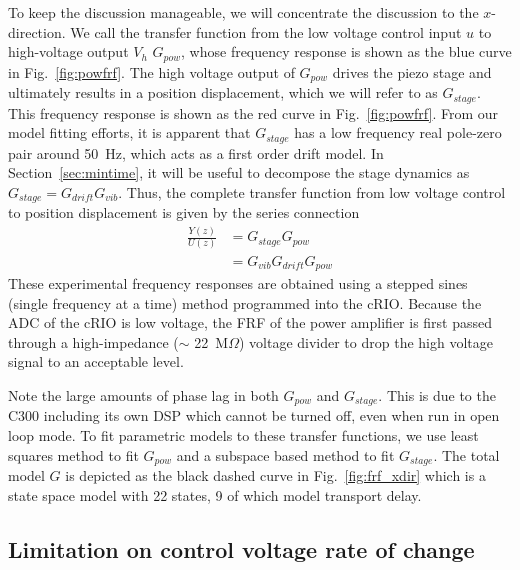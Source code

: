 \documentclass[journal,12pt,twocolumn,twoside]{IEEEtran/IEEEtran}
\begin{document}
To keep the discussion manageable, we will concentrate the discussion to the $x$-direction.
We call the transfer function from the low voltage control input $u$ to high-voltage output $V_{h}$ $G_{pow}$, whose frequency response is shown as the blue curve in Fig.~\ref{fig:powfrf}. The high voltage output of $G_{pow}$ drives the piezo stage and ultimately results in a position displacement, which we will refer to as $G_{stage}$. This frequency response is shown as the red curve in Fig.~\ref{fig:powfrf}. From our model fitting efforts, it is apparent that $G_{stage}$ has a low frequency real pole-zero pair around 50~Hz, which acts as a first order drift model. In Section~\ref{sec:mintime}, it will be useful to decompose the stage dynamics as $G_{stage} = G_{drift}G_{vib}$. 
Thus, the complete transfer function from low voltage control to position displacement is given by the series connection
\begin{align}
  \frac{Y(z)}{U(z)} &= G_{stage}G_{pow}\\
                    & =G_{vib}G_{drift}G_{pow}
\end{align}
These experimental frequency responses are obtained using a stepped sines (single frequency at a time) method programmed into the cRIO. Because the ADC of the cRIO is low voltage, the FRF of the power amplifier is first passed through a high-impedance ($\sim$ 22~M$\Omega$) voltage divider to drop the high voltage signal to an acceptable level. 

Note the large amounts of phase lag in both $G_{pow}$ and $G_{stage}$. This is due to the C300 including its own DSP which cannot be turned off, even when run in open loop mode. To fit parametric models to these transfer functions, we use least squares method to fit $G_{pow}$ and a subspace based method to fit $G_{stage}$. 
The total model $G$ is depicted as the black dashed curve in Fig.~\ref{fig:frf_xdir} which is a state space model with 22 states, 9 of which model transport delay.



\subsection{Limitation on control voltage rate of change}
\end{document}
